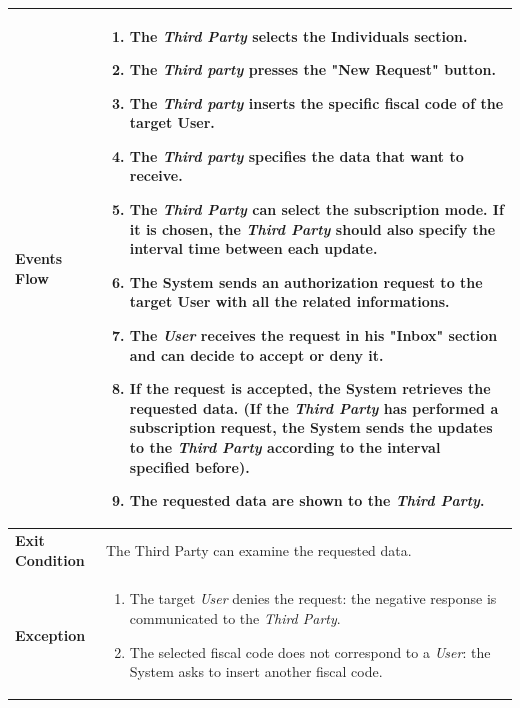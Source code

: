 \begin{table}[H]
\begin{tabular}{|p{3.5cm}|p{10.3cm}|}
    \hline
    \textbf{\large{Events Flow}}		& \begin{enumerate}[leftmargin=0.5cm]
                                            \item The \emph{Third Party} selects the Individuals section.
                                          	\item The \emph{Third party}  presses the "New Request" button.
                                            \item The \emph{Third party} inserts the specific fiscal code of the target User.
                                            \item The \emph{Third party} specifies the data that want to receive.
                                            \item The \emph{Third Party} can select the subscription mode. If 
                                        it is chosen, the \emph{Third Party} should also specify the interval time between each update.
                                            \item The System sends an authorization request to the target User with all the related informations.
                                            \item  The \emph{User} receives the request in his "Inbox" section and can decide to accept or deny it.
                                            \item If the request is accepted, the System retrieves the requested data. (If the \emph{Third Party} has performed a subscription request, the System sends the updates to the \emph{Third Party} according to the interval specified before).
                                            \item The requested data are shown to the \emph{Third Party}.
                                
                                          \end{enumerate}
    										\\
    \hline
    \textbf{\large{Exit Condition}} 	& The Third Party can examine the requested data. \\
    
    \hline
    \textbf{\large{Exception}} 			& \begin{enumerate}[leftmargin=0.5cm]
                                          	\item The target \emph{User} denies the request: the negative response is communicated to the \emph{Third Party}.
                                          	\item The selected fiscal code does not correspond to a \emph{User}: the System asks to insert another fiscal code.
	\end{enumerate}\\
    
    \hline
    
    \end{tabular}
	
\end{table}

